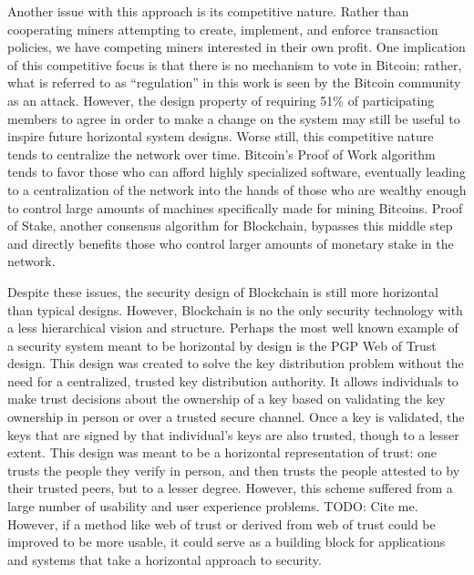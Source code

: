 Another issue with this approach is its competitive nature. Rather than
cooperating miners attempting to create, implement, and enforce transaction
policies, we have competing miners interested in their own profit. One
implication of this competitive focus is that there is no mechanism to vote in
Bitcoin; rather, what is referred to as ``regulation'' in this work is seen by
the Bitcoin community as an attack. However, the design property of requiring
51\% of participating members to agree in order to make a change on the system
may still be useful to inspire future horizontal system designs. Worse still,
this competitive nature tends to centralize the network over time. Bitcoin's
Proof of Work algorithm tends to favor those who can afford highly specialized
software, eventually leading to a centralization of the network into the hands
of those who are wealthy enough to control large amounts of machines
specifically made for mining Bitcoins. Proof of Stake, another consensus
algorithm for Blockchain, bypasses this middle step and directly benefits those
who control larger amounts of monetary stake in the network.


Despite these issues, the security design of Blockchain is still more horizontal
than typical designs. However, Blockchain is no the only security technology
with a less hierarchical vision and structure. Perhaps the most well known
example of a security system meant to be horizontal by design is the PGP Web of
Trust design. This design was created to solve the key distribution problem
without the need for a centralized, trusted key distribution authority. It
allows individuals to make trust decisions about the ownership of a key based on
validating the key ownership in person or over a trusted secure channel. Once a
key is validated, the keys that are signed by that individual's keys are also
trusted, though to a lesser extent. This design was meant to be a horizontal
representation of trust: one trusts the people they verify in person, and then
trusts the people attested to by their trusted peers, but to a lesser degree.
However, this scheme suffered from a large number of usability and user
experience problems. {\color{red} TODO: Cite me.} However, if a method like web
of trust or derived from web of trust could be improved to be more usable, it
could serve as a building block for applications and systems that take a
horizontal approach to security.

